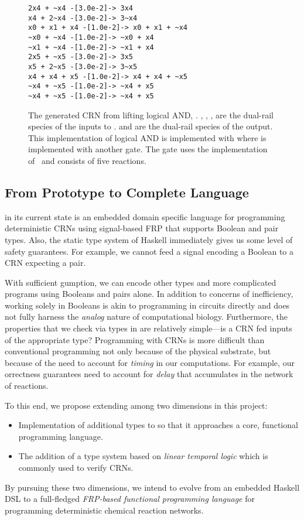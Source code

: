 \begin{figure}
\begin{center}
\begin{BVerbatim}
2x4 + ~x4 -[3.0e-2]-> 3x4
x4 + 2~x4 -[3.0e-2]-> 3~x4
x0 + x1 + x4 -[1.0e-2]-> x0 + x1 + ~x4
~x0 + ~x4 -[1.0e-2]-> ~x0 + x4
~x1 + ~x4 -[1.0e-2]-> ~x1 + x4
2x5 + ~x5 -[3.0e-2]-> 3x5
x5 + 2~x5 -[3.0e-2]-> 3~x5
x4 + x4 + x5 -[1.0e-2]-> x4 + x4 + ~x5
~x4 + ~x5 -[1.0e-2]-> ~x4 + x5
~x4 + ~x5 -[1.0e-2]-> ~x4 + x5
\end{BVerbatim}
\caption{The generated CRN from lifting logical AND, .
  , , ,  are the dual-rail species of the inputs to \hask{(&&)}.
   and  are the dual-rail species of the output.
  This implementation of logical AND is implemented with  where  is implemented with another  gate.
  The  gate uses the implementation of~\cite{rdc} and consists of five reactions.
  }
\label{fig:and-crn}
\end{center}
\end{figure}

\subsection{From Prototype to Complete Language}
\reactamole{} in its current state is an embedded domain specific language for programming deterministic CRNs using signal-based FRP that supports Boolean and pair types.
Also, the static type system of Haskell immediately gives us some level of safety guarantees.
For example, we cannot feed a signal encoding a Boolean to a CRN expecting a pair.

With sufficient gumption, we can encode other types and more complicated programs using Booleans and pairs alone.
In addition to concerns of inefficiency, working solely in Booleans is akin to programming in circuits directly and does not fully harness the \emph{analog} nature of computational biology.
Furthermore, the properties that we check via types in \reactamole{} are relatively simple---is a CRN fed inputs of the appropriate type?
Programming with CRNs is more difficult than conventional programming not only because of the physical substrate, but because of the need to account for \emph{timing} in our computations.
For example, our orrectness guarantees need to account for \emph{delay} that accumulates in the network of reactions.

To this end, we propose extending \reactamole{} among two dimensions in this project:
\begin{itemize}[itemsep=0pt]
  \item Implementation of additional types to \reactamole{} so that it approaches a core, functional programming language.
  \item The addition of a type system based on \emph{linear temporal logic} which is commonly used to verify CRNs.
\end{itemize}
By pursuing these two dimensions, we intend to evolve \reactamole from an embedded Haskell DSL to a full-fledged \emph{FRP-based functional programming language} for programming deterministic chemical reaction networks.

